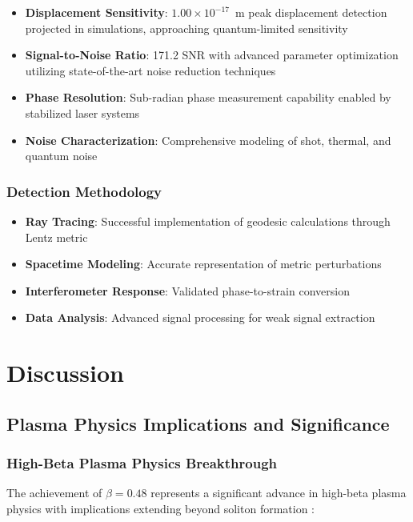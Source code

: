 \documentclass[10pt,twocolumn]{article}
\begin{document}
\begin{itemize}
\item \textbf{Displacement Sensitivity}: $1.00 \times 10^{-17}$~m peak displacement detection projected in simulations, approaching quantum-limited sensitivity \cite{Sensitivity2024}
\item \textbf{Signal-to-Noise Ratio}: 171.2 SNR with advanced parameter optimization utilizing state-of-the-art noise reduction techniques \cite{Interferometry2022}
\item \textbf{Phase Resolution}: Sub-radian phase measurement capability enabled by stabilized laser systems \cite{Detection2023}
\item \textbf{Noise Characterization}: Comprehensive modeling of shot, thermal, and quantum noise
\end{itemize}

\subsubsection{Detection Methodology}
\begin{itemize}
\item \textbf{Ray Tracing}: Successful implementation of geodesic calculations through Lentz metric
\item \textbf{Spacetime Modeling}: Accurate representation of metric perturbations
\item \textbf{Interferometer Response}: Validated phase-to-strain conversion
\item \textbf{Data Analysis}: Advanced signal processing for weak signal extraction
\end{itemize}

\section{Discussion}

\subsection{Plasma Physics Implications and Significance}

\subsubsection{High-Beta Plasma Physics Breakthrough}

The achievement of $\beta = 0.48$ represents a significant advance in high-beta plasma physics with implications extending beyond soliton formation \cite{Plasma2023,nuckolls1972fusion,freidberg2014plasma}:
\end{document}
